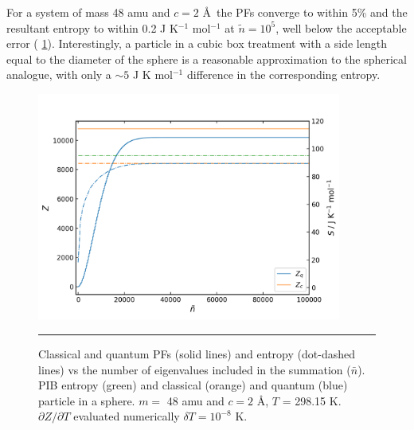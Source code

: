 \documentclass[../main.tex]{subfiles}
\begin{document}
For a system of mass 48 amu and $c = 2$ \AA~the PFs converge to within 5\% and the resultant entropy to within 0.2 J K$^{-1}$ mol$^{-1}$ at $\tilde{n} = 10^5$, well below the acceptable error (\figurename{ \ref{spherical_well_z_s_qunat_classical}}). Interestingly, a particle in a cubic box treatment with a side length equal to the diameter of the sphere is a reasonable approximation to the spherical analogue, with only a $\sim 5$ J K mol$^{-1}$ difference in the corresponding entropy.

\begin{figure}[h!]
	\centering
	\includegraphics[height=7.5cm]{4/figs/spherical_well_z_s_qunat_classical}
	\vspace{0.2cm}
	\hrule
	\caption{Classical and quantum PFs (solid lines) and entropy (dot-dashed lines) vs the number of eigenvalues included in the summation ($\bar{n}$). PIB entropy (green) and classical (orange) and quantum (blue) particle in a sphere. $m =$ 48 amu and $c = 2$ \AA, $T$ = 298.15 K. $\partial Z / \partial T$ evaluated numerically $\delta T = 10^{-8}$ K.} 
	\label{spherical_well_z_s_qunat_classical}
\end{figure}
\end{document}
